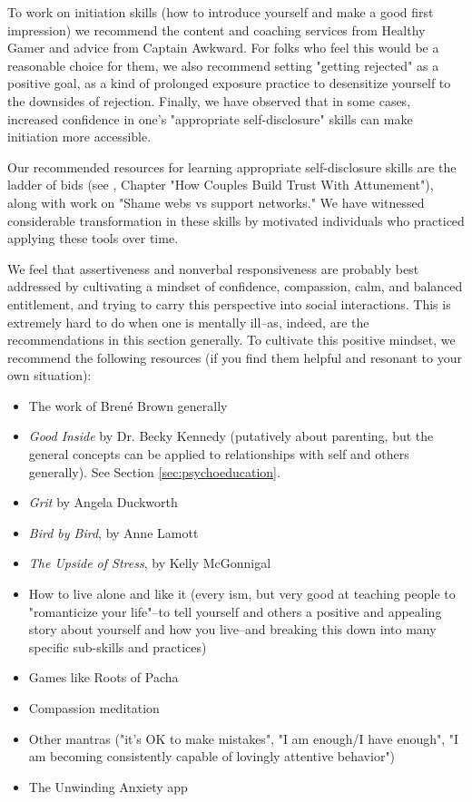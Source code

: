\documentclass[12pt,letterpaper]{book}
\begin{document}
To work on initiation skills (how to introduce yourself and make a good first impression) we recommend the content and coaching services from Healthy Gamer and advice from Captain Awkward. For folks who feel this would be a reasonable choice for them, we also recommend setting "getting rejected" as a positive goal, as a kind of prolonged exposure practice to desensitize yourself to the downsides of rejection. Finally, we have observed that in some cases, increased confidence in one's "appropriate self-disclosure" skills can make initiation more accessible.

Our recommended resources for learning appropriate self-disclosure skills are the ladder of bids (see \textcite{gottmanTrust}, Chapter "How Couples Build Trust With Attunement"), along with \textcite{brownDaring} work on "Shame webs vs support networks." We have witnessed considerable transformation in these skills by motivated individuals who practiced applying these tools over time.

We feel that assertiveness and nonverbal responsiveness are probably best addressed by cultivating a mindset of confidence, compassion, calm, and balanced entitlement, and trying to carry this perspective into social interactions. This is extremely hard to do when one is mentally ill–as, indeed, are the recommendations in this section generally. To cultivate this positive mindset, we recommend the following resources (if you find them helpful and resonant to your own situation):
\begin{itemize}
	\item The work of Bren{\'e} Brown generally
	\item \textit{Good Inside} by Dr. Becky Kennedy (putatively about parenting, but the general concepts can be applied to relationships with self and others generally). See Section \ref{sec:psychoeducation}.
	\item \textit{Grit} by Angela Duckworth
	\item \textit{Bird by Bird}, by Anne Lamott
	\item \textit{The Upside of Stress}, by Kelly McGonnigal
	\item How to live alone and like it (every ism, but very good at teaching people to "romanticize your life"–to tell yourself and others a positive and appealing story about yourself and how you live–and breaking this down into many specific sub-skills and practices)
	\item Games like Roots of Pacha
	\item Compassion meditation
	\item Other mantras ("it's OK to make mistakes", "I am enough/I have enough", "I am becoming consistently capable of lovingly attentive behavior")
	\item The Unwinding Anxiety app
\end{itemize}
\end{document}
